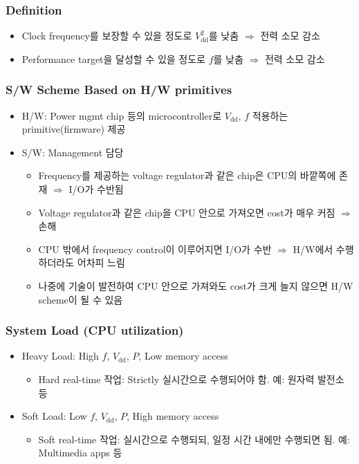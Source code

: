 \subsubsection*{Definition}
\begin{itemize}
    \item Clock frequency를 보장할 수 있을 정도로 $V_\mathrm{dd}^2$를 낮춤 $\Rightarrow$ 전력 소모 감소
    \item Performance target을 달성할 수 있을 정도로 $f$를 낮춤 $\Rightarrow$ 전력 소모 감소
\end{itemize}

\subsubsection*{S/W Scheme Based on H/W primitives}
\begin{itemize}
    \item H/W: Power mgmt chip 등의 microcontroller로 $V_{\mathrm{dd}}$, $f$ 적용하는 primitive(firmware) 제공
    \item S/W: Management 담당
    \begin{itemize}
        \item Frequency를 제공하는 voltage regulator과 같은 chip은 CPU의 바깥쪽에 존재 $\Rightarrow$ I/O가 수반됨
        \item Voltage regulator과 같은 chip을 CPU 안으로 가져오면 cost가 매우 커짐 $\Rightarrow$ 손해
        \item CPU 밖에서 frequency control이 이루어지면 I/O가 수반 $\Rightarrow$ H/W에서 수행하더라도 어차피 느림
        \item 나중에 기술이 발전하여 CPU 안으로 가져와도 cost가 크게 늘지 않으면 H/W scheme이 될 수 있음
    \end{itemize}
\end{itemize}

\subsubsection*{System Load (CPU utilization)}
\begin{itemize}
    \item Heavy Load: High $f$, $V_{\mathrm{dd}}$, $P$, Low memory access
    \begin{itemize}
        \item Hard real-time 작업: Strictly 실시간으로 수행되어야 함. 예: 원자력 발전소 등
    \end{itemize}
    \item Soft Load: Low $f$, $V_{\mathrm{dd}}$, $P$, High memory access
    \begin{itemize}
        \item Soft real-time 작업: 실시간으로 수행되되, 일정 시간 내에만 수행되면 됨. 예: Multimedia apps 등
    \end{itemize}
\end{itemize}

